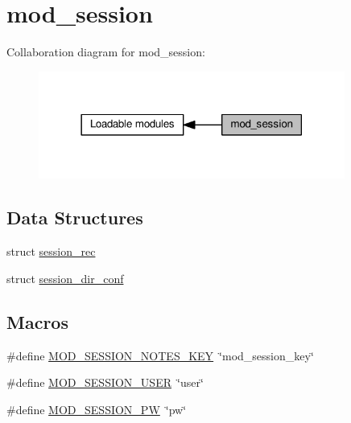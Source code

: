 \hypertarget{group__MOD__SESSION}{}\section{mod\+\_\+session}
\label{group__MOD__SESSION}
Collaboration diagram for mod\+\_\+session\+:
\nopagebreak
\begin{figure}[H]
\begin{center}
\leavevmode
\includegraphics[width=285pt]{group__MOD__SESSION}
\end{center}
\end{figure}
\subsection*{Data Structures}
\begin{DoxyCompactItemize}
\item 
struct \hyperlink{structsession__rec}{session\+\_\+rec}
\item 
struct \hyperlink{structsession__dir__conf}{session\+\_\+dir\+\_\+conf}
\end{DoxyCompactItemize}
\subsection*{Macros}
\begin{DoxyCompactItemize}
\item 
\#define \hyperlink{group__MOD__SESSION_ga61002f89881b278472205a93205c1c88}{M\+O\+D\+\_\+\+S\+E\+S\+S\+I\+O\+N\+\_\+\+N\+O\+T\+E\+S\+\_\+\+K\+EY}~\char`\"{}mod\+\_\+session\+\_\+key\char`\"{}
\item 
\#define \hyperlink{group__MOD__SESSION_ga5d6504ca778c088139a2f5c622350f15}{M\+O\+D\+\_\+\+S\+E\+S\+S\+I\+O\+N\+\_\+\+U\+S\+ER}~\char`\"{}user\char`\"{}
\item 
\#define \hyperlink{group__MOD__SESSION_gab8f2aeb85b50c2ab8a560dfbcd4dbe55}{M\+O\+D\+\_\+\+S\+E\+S\+S\+I\+O\+N\+\_\+\+PW}~\char`\"{}pw\char`\"{}
\end{DoxyCompactItemize}
